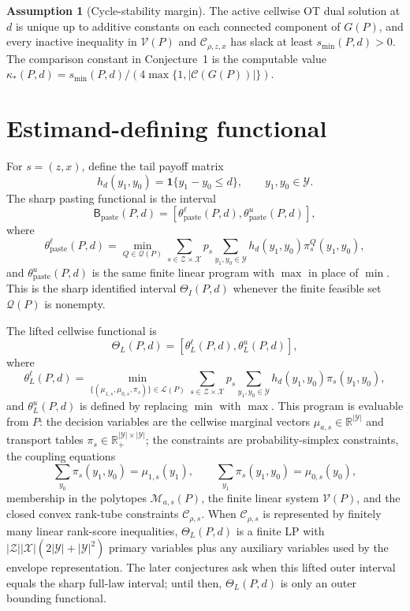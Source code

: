\documentclass[11pt]{article}
\newcommand{\one}{\mathbf{1}}
\theoremstyle{definition}
\newtheorem{assumption}{Assumption}
\theoremstyle{plain}
\theoremstyle{remark}
\begin{document}
\begin{assumption}[Cycle-stability margin]\label{ass:cycle-margin}
The active cellwise OT dual solution at \(d\) is unique up to additive constants on each connected component of \(G(P)\), and every inactive inequality in \(\mathcal V(P)\) and \(\mathcal C_{\rho,z,x}\) has slack at least \(s_{\min}(P,d)>0\).  The comparison constant in Conjecture~1 is the computable value \(\kappa_*(P,d)=s_{\min}(P,d)/(4\max\{1,|\mathcal C(G(P))|\})\).
\end{assumption}

\section{Estimand-defining functional}
For \(s=(z,x)\), define the tail payoff matrix
\[
h_d(y_1,y_0)=\one\{y_1-y_0\le d\},\qquad y_1,y_0\in\mathcal Y.
\]
The sharp pasting functional is the interval
\[
\mathsf B_{\mathrm{paste}}(P,d)=
\left[
\theta_{\mathrm{paste}}^\ell(P,d),
\theta_{\mathrm{paste}}^u(P,d)
\right],
\]
where
\[
\theta_{\mathrm{paste}}^\ell(P,d)=\min_{Q\in\mathcal Q(P)}
\sum_{s\in\mathcal Z\times\mathcal X} p_s
\sum_{y_1,y_0\in\mathcal Y} h_d(y_1,y_0)\pi_s^Q(y_1,y_0),
\]
and \(\theta_{\mathrm{paste}}^u(P,d)\) is the same finite linear program with \(\max\) in place of \(\min\).  This is the sharp identified interval \(\Theta_I(P,d)\) whenever the finite feasible set \(\mathcal Q(P)\) is nonempty.

The lifted cellwise functional is
\[
\Theta_L(P,d)=
\left[
\theta_L^\ell(P,d),
\theta_L^u(P,d)
\right],
\]
where
\[
\theta_L^\ell(P,d)=\min_{\{(\mu_{1,s},\mu_{0,s},\pi_s)\}\in\mathcal L(P)}
\sum_{s\in\mathcal Z\times\mathcal X} p_s
\sum_{y_1,y_0\in\mathcal Y} h_d(y_1,y_0)\pi_s(y_1,y_0),
\]
and \(\theta_L^u(P,d)\) is defined by replacing \(\min\) with \(\max\).  This program is evaluable from \(P\): the decision variables are the cellwise marginal vectors \(\mu_{a,s}\in\mathbb R^{|\mathcal Y|}\) and transport tables \(\pi_s\in\mathbb R_+^{|\mathcal Y|\times|\mathcal Y|}\); the constraints are probability-simplex constraints, the coupling equations
\[
\sum_{y_0}\pi_s(y_1,y_0)=\mu_{1,s}(y_1),\qquad
\sum_{y_1}\pi_s(y_1,y_0)=\mu_{0,s}(y_0),
\]
membership in the polytopes \(\mathcal M_{a,s}(P)\), the finite linear system \(\mathcal V(P)\), and the closed convex rank-tube constraints \(\mathcal C_{\rho,s}\).  When \(\mathcal C_{\rho,s}\) is represented by finitely many linear rank-score inequalities, \(\Theta_L(P,d)\) is a finite LP with \(|\mathcal Z||\mathcal X|(2|\mathcal Y|+|\mathcal Y|^2)\) primary variables plus any auxiliary variables used by the envelope representation.  The later conjectures ask when this lifted outer interval equals the sharp full-law interval; until then, \(\Theta_L(P,d)\) is only an outer bounding functional.
\end{document}
